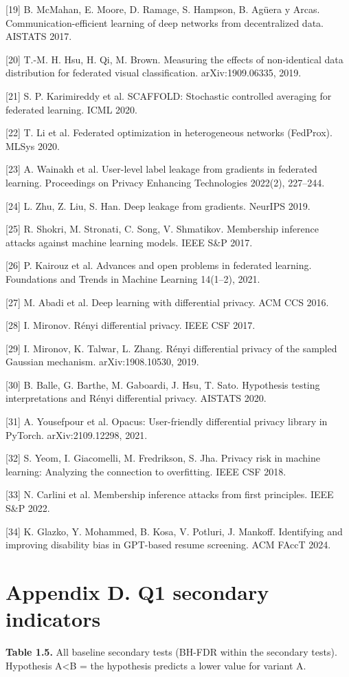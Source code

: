 \documentclass[10pt,a4paper]{article}
\begin{document}
[19] B. McMahan, E. Moore, D. Ramage, S. Hampson, B. Ag\"uera y Arcas. Communication-efficient learning of deep networks from decentralized data. AISTATS 2017.

[20] T.-M. H. Hsu, H. Qi, M. Brown. Measuring the effects of non-identical data distribution for federated visual classification. arXiv:1909.06335, 2019.

[21] S. P. Karimireddy et al. SCAFFOLD: Stochastic controlled averaging for federated learning. ICML 2020.

[22] T. Li et al. Federated optimization in heterogeneous networks (FedProx). MLSys 2020.

[23] A. Wainakh et al. User-level label leakage from gradients in federated learning. Proceedings on Privacy Enhancing Technologies 2022(2), 227--244.

[24] L. Zhu, Z. Liu, S. Han. Deep leakage from gradients. NeurIPS 2019.

[25] R. Shokri, M. Stronati, C. Song, V. Shmatikov. Membership inference attacks against machine learning models. IEEE S\&P 2017.

[26] P. Kairouz et al. Advances and open problems in federated learning. Foundations and Trends in Machine Learning 14(1--2), 2021.

[27] M. Abadi et al. Deep learning with differential privacy. ACM CCS 2016.

[28] I. Mironov. R\'enyi differential privacy. IEEE CSF 2017.

[29] I. Mironov, K. Talwar, L. Zhang. R\'enyi differential privacy of the sampled Gaussian mechanism. arXiv:1908.10530, 2019.

[30] B. Balle, G. Barthe, M. Gaboardi, J. Hsu, T. Sato. Hypothesis testing interpretations and R\'enyi differential privacy. AISTATS 2020.

[31] A. Yousefpour et al. Opacus: User-friendly differential privacy library in PyTorch. arXiv:2109.12298, 2021.

[32] S. Yeom, I. Giacomelli, M. Fredrikson, S. Jha. Privacy risk in machine learning: Analyzing the connection to overfitting. IEEE CSF 2018.

[33] N. Carlini et al. Membership inference attacks from first principles. IEEE S\&P 2022.

[34] K. Glazko, Y. Mohammed, B. Kosa, V. Potluri, J. Mankoff. Identifying and improving disability bias in GPT-based resume screening. ACM FAccT 2024.

\clearpage
\section*{Appendix D. Q1 secondary indicators}
{\small \textbf{Table 1.5.} All baseline secondary tests (BH-FDR within the secondary tests). Hypothesis A\textless{}B = the hypothesis predicts a lower value for variant A.}
\end{document}
